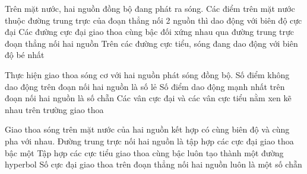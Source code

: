 \begin{ex}
Trên mặt nước, hai nguồn đồng bộ đang phát ra sóng.
{Các điểm trên mặt nước thuộc đường trung trực của đoạn thẳng nối 2 nguồn thì dao động với biên độ cực đại}
{\True Các đường cực đại giao thoa cùng bậc đối xứng nhau qua đường trung trực đoạn thẳng nối hai nguồn}
{\True Trên các đường cực tiểu, sóng đang dao động với biên độ bé nhất}
\loigiai{
\begin{itemchoice}
\itemch
\itemch
\itemch
\itemch
\end{itemchoice}
}
\end{ex} 
\begin{ex}
Thực hiện giao thoa sóng cơ với hai nguồn phát sóng đồng bộ.
{Số điểm không dao động trên đoạn nối hai nguồn là số lẻ}
{Số điểm dao động mạnh nhất trên đoạn nối hai nguồn là số chẵn}
{\True Các vân cực đại và các vân cực tiểu nằm xen kẽ nhau trên trường giao thoa}
\loigiai{
\begin{itemchoice}
\itemch
\itemch
\itemch
\itemch
\end{itemchoice}
}
\end{ex} 
\begin{ex}
Giao thoa sóng trên mặt nước của hai nguồn kết hợp có cùng biên độ và cùng pha với nhau.
{Đường trung trực nối hai nguồn là tập hợp các cực đại giao thoa bậc một}
{\True Tập hợp các cực tiểu giao thoa cùng bậc luôn tạo thành một đường hyperbol}
{Số cực đại giao thoa trên đoạn thẳng nối hai nguồn luôn là một số chẵn}
\loigiai{
\begin{itemchoice}
\itemch
\itemch
\itemch
\itemch
\end{itemchoice}
}
\end{ex} 